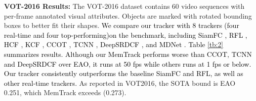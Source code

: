 \documentclass[runningheads]{llncs}
\newcommand{\ty}[1]{\textcolor{black}{#1}}
\newcommand{\tyy}[1]{\textcolor{black}{#1}}
\begin{document}

\textbf{VOT-2016 Results:} The VOT-2016 dataset contains 60 video sequences with per-frame annotated visual attributes. Objects are marked with rotated bounding boxes to better fit their shapes. \ty{We compare our tracker with 8 trackers (four real-time and four top-performing)on the benchmark, including SiamFC \cite{Bertinetto2016}, RFL \cite{Yang2017},   HCF \cite{Ma2015}, KCF \cite{Henriques2015},  CCOT \cite{Danelljan2016-1}, TCNN \cite{Nam2016-1}, DeepSRDCF \cite{Danelljan2016-2}, and MDNet \cite{Nam2016}.
Table \ref{tb:2} summarizes results. Although our MemTrack performs worse than \tyy{CCOT, TCNN and DeepSRDCF over EAO}, it runs at 50 fps while others runs at 1 fps or below. Our tracker consistently outperforms the baseline SiamFC and RFL, as well as other real-time trackers.} As reported
in VOT2016, the SOTA bound is EAO 0.251, which
MemTrack exceeds (0.273).
\end{document}
